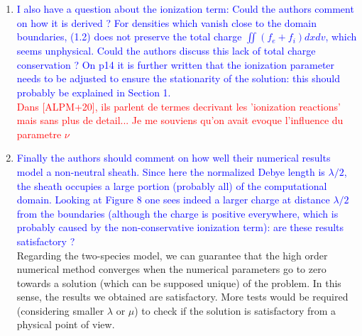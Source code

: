 \documentclass{article}
\begin{document}
\begin{enumerate}
{the Poisson equation is solved using (2.1), and later that only (1.8) will be used:
does that mean via (2.1) ? With or without the modification suggested by Remark 2.1 ? }
\textcolor{red}{Meme question que 2-3.}
\item \textcolor{blue}{I also have a question about the ionization term: Could the authors comment on how
it is derived ? For densities which vanish close to the domain boundaries,
(1.2) does not preserve the total charge $\iint (f_e + f_i) dx dv$, which seems unphysical.
Could the authors discuss this lack of total charge conservation ?
On p14 it is further written that the ionization parameter needs to be adjusted to ensure the
stationarity of the solution: this should probably be explained in Section 1. }\\ 
\textcolor{red}{Dans [ALPM+20], ils parlent de termes decrivant les 'ionization reactions' mais sans plus de detail... Je me souviens qu'on avait evoque l'influence du parametre $\nu$ }
\item \textcolor{blue}{Finally the authors should comment on how well their numerical results model a non-neutral sheath. Since here the normalized Debye length is $\lambda/2$, the sheath
occupies a large portion (probably all) of the computational domain.
Looking at Figure 8 one sees indeed a larger charge at distance $\lambda/2$ from the boundaries (although the charge is positive everywhere, which is probably
caused by the non-conservative ionization term): are these results satisfactory ?}\\ 
Regarding the two-species model, we can guarantee that the high order numerical method converges when the numerical parameters 
go to zero towards a solution (which can be supposed unique) of the problem. In this sense, the results we obtained are satisfactory. 
More tests would be required (considering smaller $\lambda$ or $\mu$) to check if the solution is satisfactory from a physical point of view. 
\end{enumerate}
\end{document}
